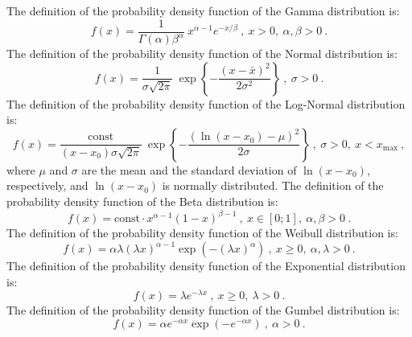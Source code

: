 \documentclass[12pt,a4paper,final,twoside]{stylevk}
\begin{document}
The definition of the probability density function of the Gamma
distribution is:
%
\begin{equation}\label{Eq_GammaDist}
 f(x) =  \frac{1}{\Gamma(\alpha)\beta^\alpha} ~ x^{\alpha-1}
 e^{-x/\beta} ~,~ x > 0 ,~ \alpha,\beta > 0 ~.
\end{equation}
%
The definition of the probability density function of the Normal
distribution is:
%
\begin{equation}\label{Eq_NormalDist}
 f(x) = \frac{1}{ \sigma \sqrt{2\pi}} ~ \exp \left\{ -
 \frac{(x-\bar{x})^2}{2 \sigma^2} \right\}   ~,~ \sigma > 0 ~.
\end{equation}
%
The definition of the probability density function of the Log-Normal
distribution is:
%
\begin{equation}\label{Eq_LogNormalDist}
 f(x) = \frac{\mathrm{const}}{(x-x_0) \sigma \sqrt{2\pi}} ~ \exp \left\{ -
 \frac{(\ln(x-x_0)-\mu)^2}{2\sigma}  \right\}   ~,~ \sigma > 0,~ x <
 x_\mathrm{max} ~, 
\end{equation}
where $\mu$ and $\sigma$ are the mean and the standard deviation of
$\ln(x-x_0)$, respectively, and $\ln(x-x_0)$ is normally distributed.
%
%
The definition of the probability density function of the Beta
distribution is:
%
\begin{equation}\label{Eq_BetaDist}
 f(x) = \mathrm{const} \cdot x^{\alpha-1} (1-x)^{\beta-1}  ~,~  x \in
 [0;1] ,~ \alpha,\beta > 0  ~.
\end{equation}
%
The definition of the probability density function of the Weibull 
distribution is:
%
\begin{equation}\label{Eq_WeibullDist}
 f(x) = \alpha\lambda(\lambda x)^{\alpha-1} \exp(-(\lambda x)^\alpha) ~,~ x
 \geq 0 ,~ \alpha,\lambda > 0 ~.
\end{equation}
%
The definition of the probability density function of the Exponential
distribution is:
%
\begin{equation}\label{Eq_ExpDist}
 f(x) =  \lambda e^{-\lambda x} ~,~ x\geq 0 ,~ \lambda > 0 ~.
\end{equation}
%
The definition of the probability density function of the Gumbel
distribution is:
%
\begin{equation}\label{Eq_GumbelDist}
 f(x) =  \alpha e^{-\alpha x} \exp( -e^{-\alpha x} ) ~,~ \alpha > 0
 ~. 
\end{equation}
%
\end{document}
